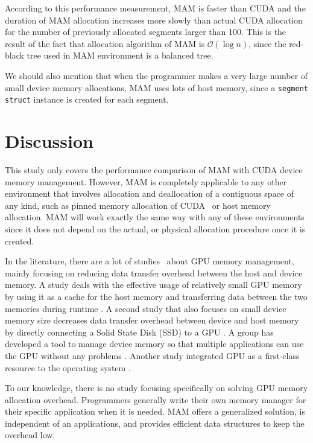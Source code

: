 \documentclass[conference]{IEEEtran}
\def\code#1{\texttt{#1}}
\begin{document}
According to this performance measurement, MAM is faster than CUDA and the duration of MAM allocation increases more slowly than actual CUDA allocation for the number of previously allocated segments larger than 100. This is the result of the fact that allocation algorithm of MAM is $\mathcal{O}(\log n)$, since the red-black tree used in MAM environment is a balanced tree. 

We should also mention that when the programmer makes a very large number of small device memory allocations, MAM uses lots of host memory, since a \code{segment struct} instance is created for each segment.



\section{Discussion}
This study only covers the performance comparison of MAM with CUDA device memory management. However, MAM is completely applicable to any other environment that involves allocation and deallocation of a contiguous space of any kind, such as pinned memory allocation of CUDA~\cite{ICPP-Burak} or host memory allocation. MAM will work exactly the same way with any of these environments since it does not depend on the actual, or physical allocation procedure once it is created.

In the literature, there are a lot of studies~\cite{ICPP-Burak, dCUDA, CuMAS} about GPU memory management, mainly  focusing 
on reducing data transfer overhead between the host and device memory. A study deals with the effective usage of relatively small GPU memory by using it as a cache for the host memory and transferring data between the two memories during runtime \cite{gpudmm}. A second study that also focuses on small device memory size decreases data transfer overhead between device and host memory by directly connecting  a Solid State Disk (SSD) to a GPU \cite{gpussd}. A group has developed a tool to manage device memory so that multiple applications can use the GPU without any problems \cite{gdm}. Another study integrated GPU as a first-class resource to the operating system \cite{gdev}.

To our knowledge, there is no study focusing specifically on solving GPU memory allocation overhead. Programmers generally write their own memory manager for their specific application when it is needed. MAM offers a generalized solution, is independent of an applications, and provides efficient data structures to keep the overhead low. 
\end{document}
